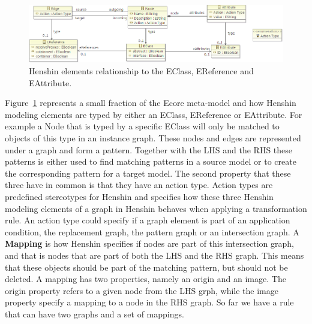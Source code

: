 \begin{figure}[H]
	\centering
	\includegraphics[scale=0.65]{./Figures/Node_edge_attribute.png}
	\caption[Henshin relationship with Ecore]
	{Henshin elements relationship to the EClass, EReference and EAttribute.}
	\label{fig:henshin_ecore}
\end{figure}

Figure~\ref{fig:henshin_ecore} represents a small fraction of the Ecore
meta-model and how Henshin modeling elements are typed by either an EClass,
EReference or EAttribute. For example a Node that is typed by a specific EClass
will only be matched to objects of this type in an instance graph. These nodes
and edges are represented under a graph and form a pattern. Together with the
LHS and the RHS these patterns is either used to find matching patterns in a
source model or to create the corresponding pattern for a target model. The
second property that these three have in common is that they have an action
type. Action types are predefined stereotypes for Henshin and specifies how
these three Henshin modeling elements of a graph in Henshin behaves when
applying a transformation rule. An action type could specify if a graph element
is part of an application condition, the replacement graph, the pattern graph
or an intersection graph. A \textbf{Mapping} is how Henshin specifies if nodes
are part of this intersection graph, and that is nodes that are part of both
the LHS and the RHS graph. This means that these objects should be part of the
matching pattern, but should not be deleted. A mapping has two properties,
namely an origin and an image. The origin property refers to a given node from
the LHS grph, while the image property specify a mapping to a node in the RHS
graph. So far we have a rule that can have two graphs and a set of mappings. 

